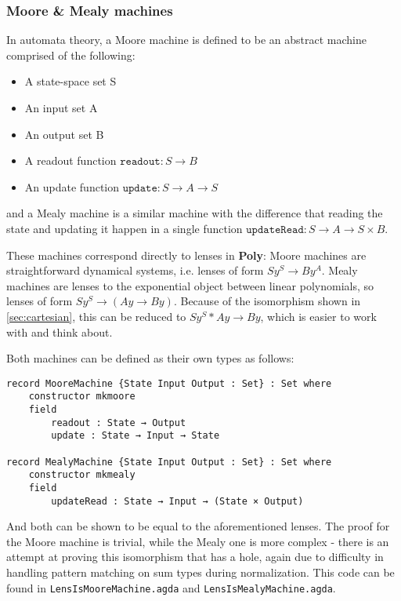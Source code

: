 \subsubsection{Moore \& Mealy machines}
In automata theory, a Moore machine is defined to be an abstract machine comprised of the following:
\begin{itemize}
    \item A state-space set S
    \item An input set A
    \item An output set B
    \item A readout function $\texttt{readout} : S \rightarrow B$
    \item An update function $\texttt{update} : S \rightarrow A \rightarrow S$
\end{itemize}

and a Mealy machine is a similar machine with the difference that reading the state and updating it happen in a single function $\texttt{updateRead} : S \rightarrow A \rightarrow S \times B$.

These machines correspond directly to lenses in \textbf{Poly}: Moore machines are straightforward dynamical systems, i.e.  lenses of form $Sy^S \rightarrow By^A$. Mealy machines are lenses to the exponential object between linear polynomials, so lenses of form $Sy^S \rightarrow (Ay \rightarrow By)$. Because of the isomorphism shown in \ref{sec:cartesian}, this can be reduced to $Sy^S * Ay \rightarrow By$, which is easier to work with and think about.

Both machines can be defined as their own types as follows:

\begin{verbatim}
record MooreMachine {State Input Output : Set} : Set where
    constructor mkmoore
    field
        readout : State → Output
        update : State → Input → State

record MealyMachine {State Input Output : Set} : Set where
    constructor mkmealy
    field
        updateRead : State → Input → (State × Output)
\end{verbatim}

And both can be shown to be equal to the aforementioned lenses. The proof for the Moore machine is trivial, while the Mealy one is more complex - there is an attempt at proving this isomorphism that has a hole, again due to difficulty in handling pattern matching on sum types during normalization. This code can be found in \texttt{LensIsMooreMachine.agda} and \texttt{LensIsMealyMachine.agda}.

